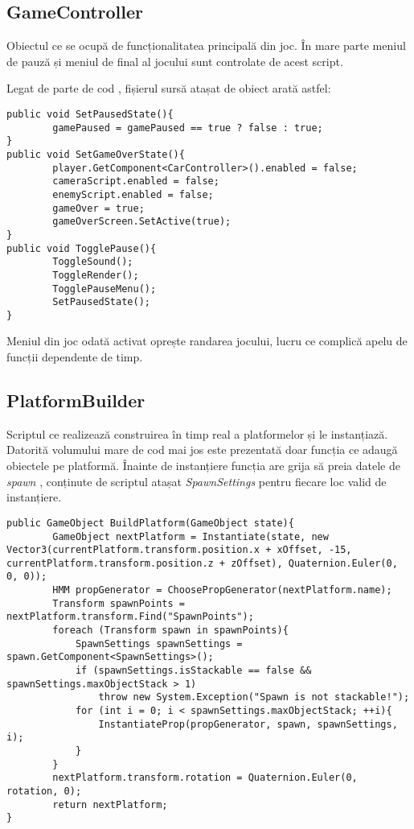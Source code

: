 \subsection{GameController}

Obiectul ce se ocupă de funcționalitatea principală din joc. În mare parte meniul de pauză și meniul de final al jocului sunt controlate de acest script.\par

Legat de parte de cod , fișierul sursă atașat de obiect arată astfel:\par

\begin{lstlisting}[caption=Funcțiile din GameController,
  label=a_label]
public void SetPausedState(){
        gamePaused = gamePaused == true ? false : true;
}
public void SetGameOverState(){
        player.GetComponent<CarController>().enabled = false;
        cameraScript.enabled = false;
        enemyScript.enabled = false;
        gameOver = true;
        gameOverScreen.SetActive(true);
}
public void TogglePause(){
        ToggleSound();
        ToggleRender();
        TogglePauseMenu();
        SetPausedState();
}
\end{lstlisting}

Meniul din joc odată activat oprește randarea jocului, lucru ce complică apelu de funcții dependente de timp.\par

\subsection{PlatformBuilder}

Scriptul ce realizează construirea în timp real a platformelor și le instanțiază. Datorită volumului mare de cod mai jos este prezentată doar funcția ce adaugă obiectele pe platformă. Înainte de instanțiere funcția are grija să preia datele de \textit{spawn} , conținute de scriptul atașat \textit{SpawnSettings} pentru fiecare loc valid de instanțiere.\par

\begin{lstlisting}[caption=Funcțiile din PlatformBuilder,
  label=a_label]
public GameObject BuildPlatform(GameObject state){
        GameObject nextPlatform = Instantiate(state, new Vector3(currentPlatform.transform.position.x + xOffset, -15, currentPlatform.transform.position.z + zOffset), Quaternion.Euler(0, 0, 0));
        HMM propGenerator = ChoosePropGenerator(nextPlatform.name);
        Transform spawnPoints = nextPlatform.transform.Find("SpawnPoints");
        foreach (Transform spawn in spawnPoints){
            SpawnSettings spawnSettings = spawn.GetComponent<SpawnSettings>();
            if (spawnSettings.isStackable == false && spawnSettings.maxObjectStack > 1)
                throw new System.Exception("Spawn is not stackable!");
            for (int i = 0; i < spawnSettings.maxObjectStack; ++i){
                InstantiateProp(propGenerator, spawn, spawnSettings, i);
            }
        }
        nextPlatform.transform.rotation = Quaternion.Euler(0, rotation, 0);
        return nextPlatform;
}
\end{lstlisting}

